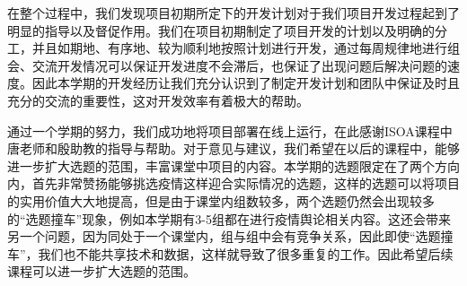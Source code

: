 \documentclass{article}
\begin{document}
在整个过程中，我们发现项目初期所定下的开发计划对于我们项目开发过程起到了明显的指导以及督促作用。我们在项目初期制定了项目开发的计划以及明确的分工，并且如期地、有序地、较为顺利地按照计划进行开发，通过每周规律地进行组会、交流开发情况可以保证开发进度不会滞后，也保证了出现问题后解决问题的速度。因此本学期的开发经历让我们充分认识到了制定开发计划和团队中保证及时且充分的交流的重要性，这对开发效率有着极大的帮助。

通过一个学期的努力，我们成功地将项目部署在线上运行，在此感谢ISOA课程中唐老师和殷助教的指导与帮助。对于意见与建议，我们希望在以后的课程中，能够进一步扩大选题的范围，丰富课堂中项目的内容。本学期的选题限定在了两个方向内，首先非常赞扬能够挑选疫情这样迎合实际情况的选题，这样的选题可以将项目的实用价值大大地提高，但是由于课堂内组数较多，两个选题仍然会出现较多的“选题撞车”现象，例如本学期有3-5组都在进行疫情舆论相关内容。这还会带来另一个问题，因为同处于一个课堂内，组与组中会有竞争关系，因此即使“选题撞车”，我们也不能共享技术和数据，这样就导致了很多重复的工作。因此希望后续课程可以进一步扩大选题的范围。
\end{document}
